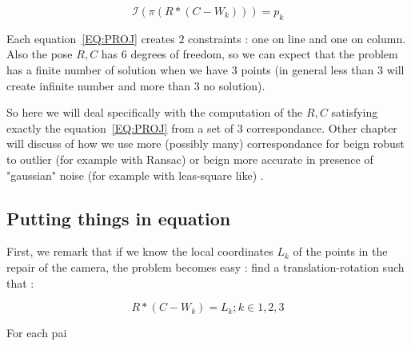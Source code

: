\begin{equation}
       \mathcal I(\pi (R*(C-W_k))) = p_k \label{EQ:PROJ}
\end{equation}


Each equation~\ref{EQ:PROJ}  creates $2$ constraints : one on line and one on column.
Also the pose $R,C$ has $6$ degrees of freedom, so we can expect that the problem has
a finite number of solution when we have $3$ points (in general less than $3$ will create
infinite number and more than $3$ no solution).

So here we will deal specifically  with the computation of the $R,C$ satisfying
exactly the equation~\ref{EQ:PROJ}  from a set of $3$ correspondance. Other
chapter will discuss of how we use more (possibly many) correspondance for beign 
robust to outlier (for
example with Ransac) or beign more accurate in presence of "gaussian" noise (for 
example with leas-square like) .



\subsection{Putting things in equation}

First, we remark that if we know the local coordinates $L_k$ of the points in the repair
of the camera, the problem becomes easy : find a translation-rotation such that  :

\begin{equation}
       R*(C-W_k) = L_k  ; k\in{1,2,3} \label{SpResecEQ:WL}
\end{equation}

For each pai





